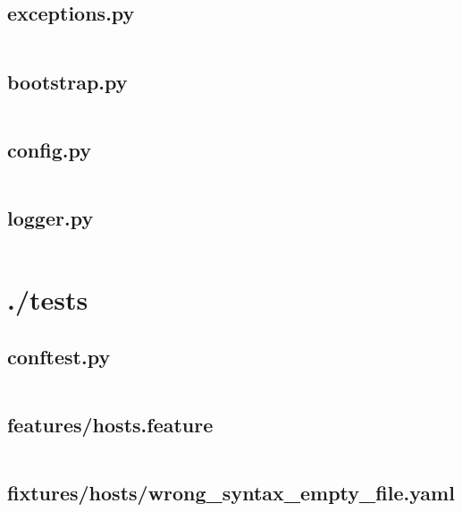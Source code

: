 \documentclass[10pt , a4paper]{report}
\newenvironment{code}{\captionsetup{type=listing}}{}
\begin{document}
\subsection{exceptions.py}
\begin{code}
  \inputminted[fontsize=\small]{Python}{../kandy_kafka/exceptions.py}
\end{code}

\subsection{bootstrap.py}
\begin{code}
  \inputminted[fontsize=\small]{Python}{../kandy_kafka/bootstrap.py}
\end{code}

\subsection{config.py}
\begin{code}
  \inputminted[fontsize=\small]{Python}{../kandy_kafka/config.py}
\end{code}

\subsection{logger.py}
\begin{code}
  \inputminted[fontsize=\small]{Python}{../kandy_kafka/logger.py}
\end{code}

\newpage
\section{./tests}
\subsection{conftest.py}
\begin{code}
  \inputminted[fontsize=\small]{Python}{../tests/conftest.py}
\end{code}

\subsection{features/hosts.feature}
\begin{code}
  \inputminted[fontsize=\small]{Gherkin}{../tests/features/hosts.feature}
\end{code}

\subsection{fixtures/hosts/wrong\_syntax\_empty\_file.yaml}
\begin{code}
  \inputminted[fontsize=\small]{YAML}{../tests/fixtures/hosts/wrong_syntax_empty_file.yaml}
\end{code}
\end{document}
